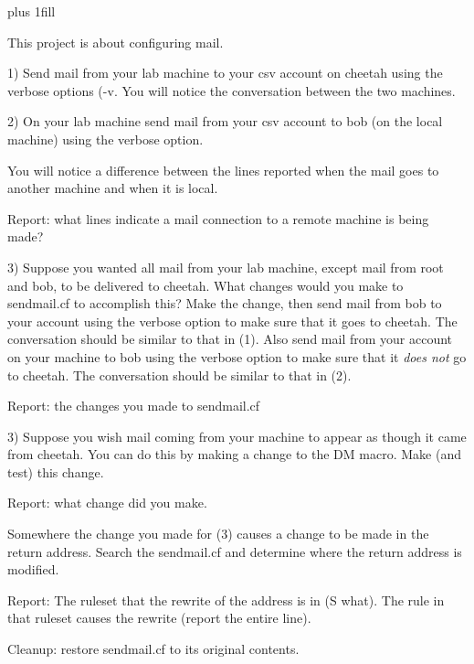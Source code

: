 
\rightskip=0pt plus 1fill

\parindent 0pt

This project is about configuring mail.

1) Send mail from your lab machine to your csv account on {\ltt{}cheetah}
using the verbose options ({\ltt{}-v}.
You will notice the conversation between the two machines.

2) On your lab machine send mail from your csv account to bob (on the
local machine) using the verbose option.

You will notice a difference between the lines reported
when the mail goes to another machine and when it is local.

Report: what lines indicate a mail connection to a remote machine
is being made?

3) Suppose you wanted all mail from your lab machine, 
except mail from {\ltt{}root} and {\ltt{}bob}, to be delivered to
{\ltt{}cheetah}.
What changes would you make to {\ltt{}sendmail.cf} to accomplish this?
Make the change, then send mail from {\ltt{}bob} to your account
using the verbose option to make sure that it goes to {\ltt{}cheetah}.
The conversation should be similar to that in (1).
Also send mail from your account on your machine to {\ltt{}bob}
using the verbose option to make sure that it {\it does not} go
to {\ltt{}cheetah}.
The conversation should be similar to that in (2).

Report: the changes you made to {\ltt{}sendmail.cf}

3) Suppose you wish mail coming from your machine to appear as though it
came from cheetah.
You can do this by making a change to the {\ltt{}DM} macro.
Make (and test) this change.

Report: what change did you make.

Somewhere the change you made for (3) causes a change to be made in the return address.
Search the {\ltt{}sendmail.cf} and determine where the return
address is modified.

Report: The ruleset that the rewrite of the address is in (S what).
The rule in that ruleset causes the rewrite (report the entire line).

Cleanup: restore {\ltt{}sendmail.cf} to its original contents.
\bye
